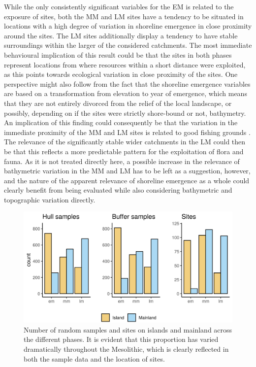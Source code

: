 \documentclass[12pt, a4paper]{article}
\begin{document}
While the only consistently significant variables for the EM is related to the exposure of sites, both the MM and LM sites have a tendency to be situated in locations with a high degree of variation in shoreline emergence in close proximity around the sites. The LM sites additionally display a tendency to have stable surroundings within the larger of the considered catchments. The most immediate behavioural implication of this result could be that the sites in both phases represent locations from where resources within a short distance were exploited, as this points towards ecological variation in close proximity of the sites. One perspective might also follow from the fact that the shoreline emergence variables are based on a transformation from elevation to year of emergence, which means that they are not entirely divorced from the relief of the local landscape, or possibly, depending on if the sites were strictly shore-bound or not, bathymetry. An implication of this finding could consequently be that the variation in the immediate proximity of the MM and LM sites is related to good fishing grounds \citep[][]{darmark2018}. The relevance of the significantly stable wider catchments in the LM could then be that this reflects a more predictable pattern for the exploitation of ﬂora and fauna. As it is not treated directly here, a possible increase in the relevance of bathymetric variation in the MM and LM has to be left as a suggestion, however, and the nature of the apparent relevance of shoreline emergence as a whole could clearly benefit from being evaluated while also considering bathymetric and topographic variation directly. \par

\begin{figure}[ht]
	\centering
	\includegraphics[width = 0.75\linewidth]{island_hist.png}
	\caption[Island/mainland among samples]{Number of random samples and sites on islands and mainland across the different phases. It is evident that this proportion has varied dramatically throughout the Mesolithic, which is clearly reflected in both the sample data and the location of sites.}
	\label{fig:island_hist}
\end{figure}
\end{document}
